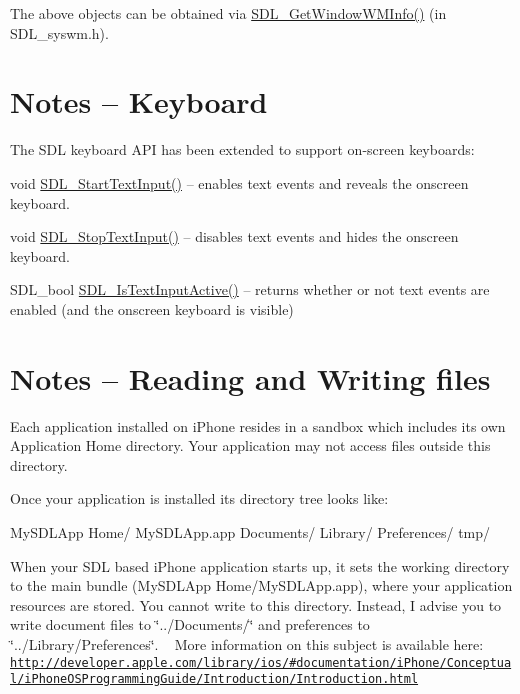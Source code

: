 The above objects can be obtained via \mbox{\hyperlink{_s_d_l__syswm_8h_ad6e40121a96c88af20d9469a04706fef}{S\+D\+L\+\_\+\+Get\+Window\+W\+M\+Info()}} (in S\+D\+L\+\_\+syswm.\+h). 

 \section*{Notes -- Keyboard }

The S\+DL keyboard A\+PI has been extended to support on-\/screen keyboards\+:

void \mbox{\hyperlink{_s_d_l__keyboard_8h_ab2c8474b9a8b6d07cae4f8eceab38870}{S\+D\+L\+\_\+\+Start\+Text\+Input()}} -- enables text events and reveals the onscreen keyboard.

void \mbox{\hyperlink{_s_d_l__keyboard_8h_ab08b914cdfb2eaed26165cb2f6b110ec}{S\+D\+L\+\_\+\+Stop\+Text\+Input()}} -- disables text events and hides the onscreen keyboard.

S\+D\+L\+\_\+bool \mbox{\hyperlink{_s_d_l__keyboard_8h_a6c84ed1daac21f8224d43bcb9d5bc597}{S\+D\+L\+\_\+\+Is\+Text\+Input\+Active()}} -- returns whether or not text events are enabled (and the onscreen keyboard is visible)



 \section*{Notes -- Reading and Writing files }

Each application installed on i\+Phone resides in a sandbox which includes its own Application Home directory. Your application may not access files outside this directory.

Once your application is installed its directory tree looks like\+: \begin{DoxyVerb}MySDLApp Home/
    MySDLApp.app
    Documents/
    Library/
        Preferences/
    tmp/
\end{DoxyVerb}


When your S\+DL based i\+Phone application starts up, it sets the working directory to the main bundle (My\+S\+D\+L\+App Home/\+My\+S\+D\+L\+App.\+app), where your application resources are stored. You cannot write to this directory. Instead, I advise you to write document files to \char`\"{}../\+Documents/\char`\"{} and preferences to \char`\"{}../\+Library/\+Preferences\char`\"{}. ~\newline
 More information on this subject is available here\+: \href{http://developer.apple.com/library/ios/#documentation/iPhone/Conceptual/iPhoneOSProgrammingGuide/Introduction/Introduction.html}{\tt http\+://developer.\+apple.\+com/library/ios/\#documentation/i\+Phone/\+Conceptual/i\+Phone\+O\+S\+Programming\+Guide/\+Introduction/\+Introduction.\+html} 

